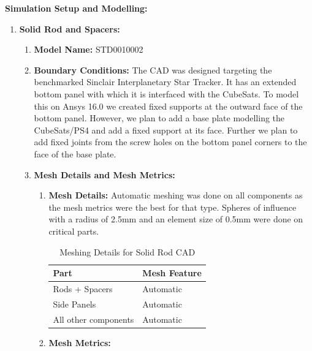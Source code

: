 \documentclass[../../main.tex]{subfiles}
\begin{document}
    \item \textbf{Simulation Setup and Modelling: }
    \begin{enumerate}
        \item \textbf{Solid Rod and Spacers:}
        \begin{enumerate}
            \item \textbf{Model Name:} STD0010002
            \item \textbf{Boundary Conditions:} The CAD was designed targeting the benchmarked Sinclair Interplanetary Star Tracker. It has an extended bottom panel with which it is interfaced with the CubeSats. To model this on Ansys 16.0 we created fixed supports at the outward face of the bottom panel. However, we plan to add a base plate modelling the CubeSats/PS4 and add a fixed support at its face. Further we plan to add fixed joints from the screw holes on the bottom panel corners to the face of the base plate.
            \item \textbf{Mesh Details and Mesh Metrics:}
            \begin{enumerate}
                \item \textbf{Mesh Details: }Automatic meshing was done on all components as the mesh metrics were the best for that type. Spheres of influence with a radius of 2.5mm and an element size of 0.5mm were done on critical parts. 
                \begin{table}[h!]
                    \centering
                    \begin{tabular}{|p{3cm}|p{3cm}|}
                    \hline
                    \textbf{Part} & \textbf{Mesh Feature} \\
                    \hline
                    Rods + Spacers & Automatic \\
                    \hline
                    Side Panels & Automatic \\
                    \hline
                    All other components & Automatic \\
                    \hline
                \end{tabular}
                \caption{Meshing Details for Solid Rod CAD}
                \label{tab:my_label}
            \end{table}
                \item \textbf{Mesh Metrics:}
                \begin{table}[h!]
                \centering
                \begin{tabular}{|p{4cm}|p{3cm}|p{3cm}|}

\end{tabular}
\end{table}
\end{enumerate}
\end{enumerate}
\end{enumerate}
\end{document}
